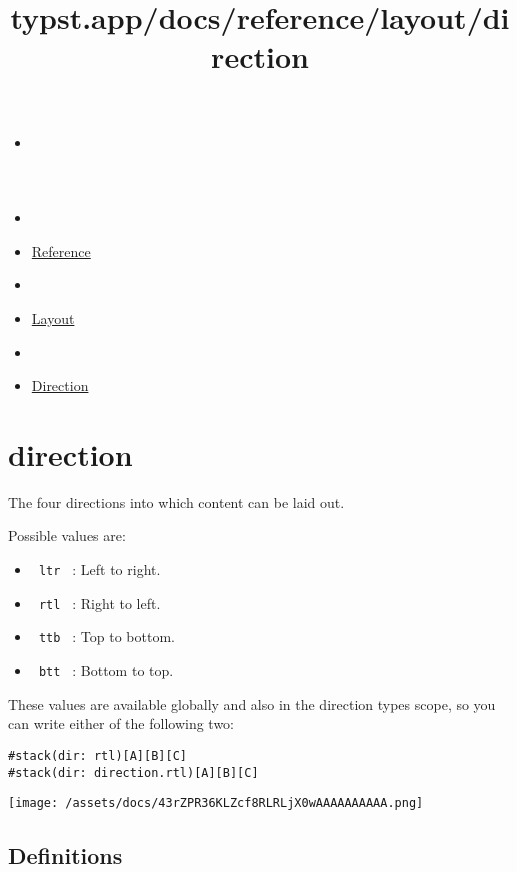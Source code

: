 \title{typst.app/docs/reference/layout/direction}

\begin{itemize}
\tightlist
\item
  \href{/docs}{}
\item
  
\item
  \href{/docs/reference/}{Reference}
\item
  
\item
  \href{/docs/reference/layout/}{Layout}
\item
  
\item
  \href{/docs/reference/layout/direction/}{Direction}
\end{itemize}

\section{\texorpdfstring{{ direction }}{ direction }}\label{summary}

The four directions into which content can be laid out.

Possible values are:

\begin{itemize}
\tightlist
\item
  \texttt{\ ltr\ } : Left to right.
\item
  \texttt{\ rtl\ } : Right to left.
\item
  \texttt{\ ttb\ } : Top to bottom.
\item
  \texttt{\ btt\ } : Bottom to top.
\end{itemize}

These values are available globally and also in the direction
type\textquotesingle s scope, so you can write either of the following
two:

\begin{verbatim}
#stack(dir: rtl)[A][B][C]
#stack(dir: direction.rtl)[A][B][C]
\end{verbatim}

\texttt{[image: /assets/docs/43rZPR36KLZcf8RLRLjX0wAAAAAAAAAA.png]}

\subsection{\texorpdfstring{{ Definitions
}}{ Definitions }}\label{definitions}

